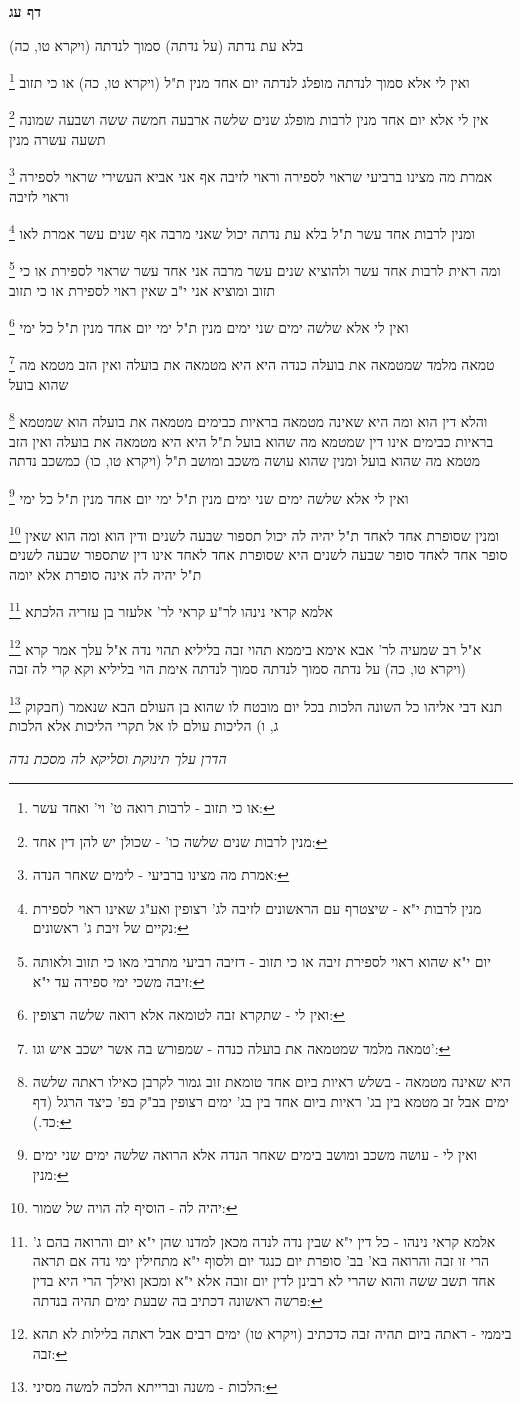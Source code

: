 \documentclass[12pt, openany]{book}
\newcommand{\sethebfont}{
\fontsize{10.5pt}{21.0pt} \selectfont
}
\newcommand{\twocol}[1]{
	{\sethebfont \begin{multicols}{2}
			#1
	\end{multicols}}	
}
\newcommand{\sectname}{}
\newcommand{\newsection}[1]{
	\addcontentsline{toc}{section}{#1}
	\renewcommand{\sectname}{#1}	
	\vspace{-\baselineskip}
	\begin{center}
		\textbf{%
\fontsize{16pt}{16pt}\selectfont
			#1}
	\end{center}
	\vspace{-\baselineskip}
	\nopagebreak
}
\newcommand{\footnotecomment}[1]{
	\renewcommand\thefootnote{}
	\footnote{#1}}
\newcommand{\commenta}[1]{\footnotecomment{#1}}
\begin{document}
\newsection{דף עג}
\twocol{(ויקרא טו, כה) בלא עת נדתה (על נדתה) סמוך לנדתה 
\commenta{או כי תזוב - לרבות רואה ט' וי' ואחד עשר:}
ואין לי אלא סמוך לנדתה מופלג לנדתה יום אחד מנין ת"ל (ויקרא טו, כה) או כי תזוב 
\commenta{מנין לרבות שנים שלשה כו' - שכולן יש להן דין אחד:}
אין לי אלא יום אחד מנין לרבות מופלג שנים שלשה ארבעה חמשה ששה ושבעה שמונה תשעה עשרה מנין 
\commenta{אמרת מה מצינו ברביעי - לימים שאחר הנדה:}
אמרת מה מצינו ברביעי שראוי לספירה וראוי לזיבה אף אני אביא העשירי שראוי לספירה וראוי לזיבה 
\commenta{מנין לרבות י"א - שיצטרף עם הראשונים לזיבה לג' רצופין ואע"ג שאינו ראוי לספירת נקיים של זיבת ג' ראשונים:}
ומנין לרבות אחד עשר ת"ל בלא עת נדתה יכול שאני מרבה אף שנים עשר אמרת לאו 
\commenta{יום י"א שהוא ראוי לספירת זיבה או כי תזוב - דזיבה רביעי מתרבי מאו כי תזוב ולאותה זיבה משכי ימי ספירה עד י"א: }
ומה ראית לרבות אחד עשר ולהוציא שנים עשר מרבה אני אחד עשר שראוי לספירת או כי תזוב ומוציא אני י"ב שאין ראוי לספירת או כי תזוב 
\commenta{ואין לי - שתקרא זבה לטומאה אלא רואה שלשה רצופין:}
ואין לי אלא שלשה ימים שני ימים מנין ת"ל ימי יום אחד מנין ת"ל כל ימי
\commenta{טמאה מלמד שמטמאה את בועלה כנדה - שמפורש בה אשר ישכב איש וגו':}
טמאה מלמד שמטמאה את בועלה כנדה היא היא מטמאה את בועלה ואין הזב מטמא מה שהוא בועל 
\commenta{היא שאינה מטמאה - בשלש ראיות ביום אחד טומאת זוב גמור לקרבן כאילו ראתה שלשה ימים אבל זב מטמא בין בג' ראיות ביום אחד בין בג' ימים רצופין בב"ק בפ' כיצד הרגל (דף כד.):}
והלא דין הוא ומה היא שאינה מטמאה בראיות כבימים מטמאה את בועלה הוא שמטמא בראיות כבימים אינו דין שמטמא מה שהוא בועל ת"ל היא היא מטמאה את בועלה ואין הזב מטמא מה שהוא בועל 
ומנין שהוא עושה משכב ומושב ת"ל (ויקרא טו, כו) כמשכב נדתה 
\commenta{ואין לי - עושה משכב ומושב בימים שאחר הנדה אלא הרואה שלשה ימים שני ימים מנין:}
ואין לי אלא שלשה ימים שני ימים מנין ת"ל ימי יום אחד מנין ת"ל כל ימי 
\commenta{יהיה לה - הוסיף לה הויה של שמור:}
ומנין שסופרת אחד לאחד ת"ל יהיה לה יכול תספור שבעה לשנים ודין הוא ומה הוא שאין סופר אחד לאחד סופר שבעה לשנים היא שסופרת אחד לאחד אינו דין שתספור שבעה לשנים ת"ל יהיה לה אינה סופרת אלא יומה
\commenta{אלמא קראי נינהו - כל דין י"א שבין נדה לנדה מכאן למדנו שהן י"א יום והרואה בהם ג' הרי זו זבה והרואה בא' בב' סופרת יום כנגד יום ולסוף י"א מתחילין ימי נדה אם תראה אחד תשב ששה והוא שהרי לא רבינן לדין יום זובה אלא י"א ומכאן ואילך הרי היא בדין פרשה ראשונה דכתיב בה שבעת ימים תהיה בנדתה:}
אלמא קראי נינהו לר"ע קראי לר' אלעזר בן עזריה הלכתא 
\commenta{ביממי - ראתה ביום תהיה זבה כדכתיב (ויקרא טו) ימים רבים אבל ראתה בלילות לא תהא זבה:}
א"ל רב שמעיה לר' אבא אימא ביממא תהוי זבה בליליא תהוי נדה א"ל עלך אמר קרא (ויקרא טו, כה) על נדתה סמוך לנדתה סמוך לנדתה אימת הוי בליליא וקא קרי לה זבה 
\commenta{הלכות - משנה וברייתא הלכה למשה מסיני:}
תנא דבי אליהו כל השונה הלכות בכל יום מובטח לו שהוא בן העולם הבא שנאמר (חבקוק ג, ו) הליכות עולם לו אל תקרי הליכות אלא הלכות
\par \par {\large\emph{הדרן עלך תינוקת וסליקא לה מסכת נדה}}\par \par 
}
\end{document}
